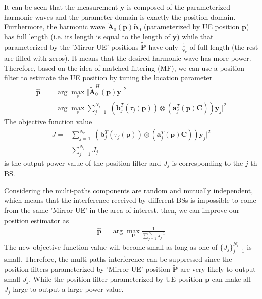 \documentclass[journal]{IEEEtran}
\def \arg{\operatorname{arg}}
\begin{document}
It can be seen that the measurement $\boldsymbol{y}$ is composed of the parameterized harmonic waves and the parameter domain is exactly the position domain. Furthermore, the harmonic wave $\tilde{\boldsymbol{A}}_0(\boldsymbol{p})\tilde{\boldsymbol{\alpha}}_0$ (parameterized by UE position $\boldsymbol{p}$) has full length (i.e. its length is equal to the length of $\boldsymbol{y}$) while that parameterized by the 'Mirror UE' positions $\tilde{\boldsymbol{P}}$ have only $\frac{1}{N_r}$ of full length (the rest are filled with zeros). It means that the desired harmonic wave has more power. Therefore, based on the idea of matched filtering (MF), we can use a position filter to estimate the UE position by tuning the location parameter
\begin{align}\label{dpd-MF}
  \hat{\boldsymbol{p}}=&\arg \max_{\boldsymbol{p}} \Vert \tilde{\boldsymbol{A}}_0^H(\boldsymbol{p})\boldsymbol{y} \Vert^2\\\nonumber
                      =&\arg \max_{\boldsymbol{p}}\sum_{j=1}^{N_r}\vert (\boldsymbol{b}^T_j(\tau_j(\boldsymbol{p}))\otimes (\boldsymbol{a}^T_j(\boldsymbol{p})\boldsymbol{C}))\boldsymbol{y}_j \vert^2
\end{align}
The objective function value 
\begin{align}\label{ObFunc}
  J=&\sum_{j=1}^{N_r} \vert (\boldsymbol{b}^T_j(\tau_j(\boldsymbol{p}))\otimes (\boldsymbol{a}^T_j(\boldsymbol{p})\boldsymbol{C}))\boldsymbol{y}_j \vert^2\\\nonumber
   =&\sum_{j=1}^{N_r} J_j
\end{align}
is the output power value of the position filter and $J_j$ is corresponding to the $j$-th BS. 

Considering the multi-paths components are random and mutually independent, which means that the interference received by different BSs is impossible to come from the same 'Mirror UE' in the area of interest. then, we can improve our position estimator as
\begin{align}\label{Iprvdpd-MF}
  \hat{\boldsymbol{p}}=\arg \max_{\boldsymbol{p}} \frac{1}{\sum_{j=1}^{N_r}J_j^{-1}}
\end{align}
The new objective function value will become small as long as one of $\{J_j\}_{j=1}^{N_r}$ is small. Therefore, the multi-paths interference can be suppressed since the position filters parameterized by 'Mirror UE' position $\tilde{\boldsymbol{P}}$ are very likely to output small $J_j$. While the position filter parameterized by UE position $\boldsymbol{p}$ can make all $J_j$ large to output a large power value.
\end{document}
